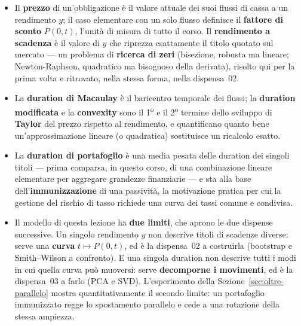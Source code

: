 \documentclass[11pt,a4paper]{article}
\theoremstyle{plain}
\theoremstyle{definition}
\theoremstyle{remark}
\begin{document}
\begin{itemize}
  \item Il \textbf{prezzo} di un'obbligazione è il valore attuale dei suoi flussi di cassa a un
        rendimento $y$; il caso elementare con un solo flusso definisce il \textbf{fattore di
        sconto} $P(0,t)$, l'unità di misura di tutto il corso. Il \textbf{rendimento a
        scadenza} è il valore di $y$ che riprezza esattamente il titolo quotato sul mercato ---
        un problema di \textbf{ricerca di zeri} (bisezione, robusta ma lineare; Newton-Raphson,
        quadratico ma bisognoso della derivata), risolto qui per la prima volta e ritrovato,
        nella stessa forma, nella dispensa~02.
  \item La \textbf{duration di Macaulay} è il baricentro temporale dei flussi; la
        \textbf{duration modificata} e la \textbf{convexity} sono il 1\textsuperscript{o} e il
        2\textsuperscript{o} termine dello sviluppo di \textbf{Taylor} del prezzo rispetto al
        rendimento, e quantificano quanto bene un'approssimazione lineare (o quadratica)
        sostituisce un ricalcolo esatto.
  \item La \textbf{duration di portafoglio} è una media pesata delle duration dei singoli
        titoli --- prima comparsa, in questo corso, di una combinazione lineare elementare per
        aggregare grandezze finanziarie --- e sta alla base dell'\textbf{immunizzazione} di una
        passività, la motivazione pratica per cui la gestione del rischio di tasso richiede una
        curva dei tassi comune e condivisa.
  \item Il modello di questa lezione ha \textbf{due limiti}, che aprono le due dispense
        successive. Un singolo rendimento $y$ non descrive titoli di scadenze diverse: serve
        una \textbf{curva} $t\mapsto P(0,t)$, ed è la dispensa~02 a costruirla (bootstrap e
        Smith--Wilson a confronto). E una singola duration non descrive tutti i modi in cui
        quella curva può muoversi: serve \textbf{decomporne i movimenti}, ed è la dispensa~03 a
        farlo (PCA e SVD). L'esperimento della Sezione~\ref{sec:oltre-parallelo} mostra
        quantitativamente il secondo limite: un portafoglio immunizzato regge lo spostamento
        parallelo e cede a una rotazione della stessa ampiezza.
\end{itemize}
\end{document}
